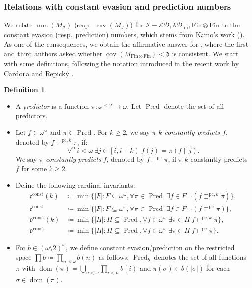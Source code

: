 \documentclass[a4paper,12pt]{amsart}
\theoremstyle{definition}
\newtheorem{dfn}[thm]{Definition}
\numberwithin{thm}{section}
\numberwithin{equation}{section}
\newcommand{\oo}{{\omega}^\omega}
\newcommand{\fsq}{\omega^{<\omega}}
\newcommand{\on}{\mathpunct{\upharpoonright}}
\newcommand{\dd}{\mathfrak{d}}
\newcommand{\ee}{\mathfrak{e}}
\DeclareMathOperator{\non}{non}
\DeclareMathOperator{\cov}{cov}
\DeclareMathOperator{\dom}{dom}
\newcommand{\ed}{\mathcal{ED}}
\DeclareMathOperator{\Pred}{Pred}
\newcommand{\I}{\mathscr{I}}
\newcommand{\edfin}{\mathcal{ED}_\mathrm{fin}}
\newcommand{\finfin}{\mathrm{Fin}\otimes\mathrm{Fin}}
\newcommand{\eec}{\ee^{\mathrm{const}}}
\newcommand{\eeck}{\ee^{\mathrm{const}}(k)}
\newcommand{\vv}{\mathfrak{v}}
\newcommand{\vvc}{\vv^{\mathrm{const}}}
\newcommand{\vvck}{\vv^{\mathrm{const}}(k)}
\newcommand{\pc}{\sqsubset^{\mathrm{pc}}}
\newcommand{\pck}{\sqsubset^{\mathrm{pc},k}}
\begin{document}
    \subsubsection{Relations with constant evasion and prediction numbers}\label{sec:rel_w_const}

    We relate $\non(M_\I)$ (resp.\ $\cov(M_\I)$) for $\I = \ed, \edfin, \finfin$ to the constant evasion (resp.\ prediction) numbers, which stems from Kamo's work (\cite{Kam00,Kam01}). As one of the consequences, we obtain the affirmative answer for \cite[Question 4.19]{CM25}, where the first and third authors asked whether $\cov(M_{\finfin})<\dd$ is consistent. We start with some definitions, following the notation introduced in the recent work by Cardona and Repick{\'y} \cite{CR25}.

    \begin{dfn}\label{dfn:constant_evasion_numbers}\leavevmode
        \begin{itemize}
            \item A \emph{predictor} is a function $\pi\colon\fsq\to\omega$. Let $\Pred$ denote the set of all predictors.
            \item Let $f\in\oo$ and $\pi\in\Pred$. For $k\geq 2$, we say \emph{$\pi$ $k$-constantly predicts $f$}, denoted by $f\pck\pi$, if:
            \[
            \forall^\infty i<\omega~ \exists j\in\left[i,i+k\right)~ f(j)=\pi(f\on j).
            \]
            We say \emph{$\pi$ constantly predicts $f$}, denoted by $f\pc\pi$, if $\pi$ $k$-constantly predicts $f$ for some $k\geq 2$.
            \item Define the following cardinal invariants: 
            \begin{align*}
				\eeck & \coloneqq\min\{|F|:F\subseteq\oo,\forall \pi\in \Pred~\exists f\in F~ \lnot(f\pck\pi)\},\\
                \eec & \coloneqq\min\{|F|:F\subseteq\oo,\forall \pi\in \Pred~\exists f\in F~ \lnot(f\pc\pi)\},\\
				\vvck & \coloneqq\min\{|\Pi|:\Pi\subseteq \Pred,\forall f\in\oo~\exists\pi\in \Pi~ f \pck \pi\},\\
                \vvc & \coloneqq\min\{|\Pi|:\Pi\subseteq \Pred,\forall f\in\oo~\exists\pi\in \Pi~ f \pc \pi\}.
		      \end{align*}
            \item For $b\in(\omega\setminus2)^\omega$, we define constant evasion/prediction on the restricted space $\prod b\coloneqq\prod_{n<\omega} b(n)$ as follows: $\Pred_b$ denotes the set of all functions $\pi$ with $\dom(\pi)=\bigcup_{n<\omega}\prod_{i<n} b(i)$ and $\pi(\sigma)\in b(|\sigma|)$ for each $\sigma\in\dom(\pi)$. 

\end{itemize}
\end{dfn}
\end{document}
